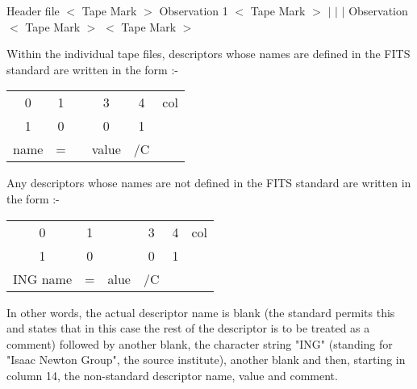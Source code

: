 {{  Header file \newline
  $<$ Tape Mark $>$ \newline
  Observation  1 \newline
  $<$ Tape Mark $>$ \newline
  $\mid$ \newline
  $\mid$ \newline
  $\mid$ \newline
  Observation   \newline
  $<$ Tape Mark $>$ \newline
  $<$ Tape Mark $>$
                                                                               
  Within the individual tape files, descriptors whose names are defined
  in the FITS standard are written in the form :-
                        
\begin{tabular}{ccp{0.5in}ccc}                                                       
  0     &   1 &       &           3       &   4  &   col \\
  1     &   0 &       &           0       &   1  &    \\
  name  &  =  &       &       value       &   /C &    \\
\end{tabular}
                                                                               
  Any descriptors whose names are not defined in the FITS standard are
  written in the form :-
                                                                               
\begin{tabular}{ccp{0.5in}ccc}                                                       
  0         &   1 &       &           3       &   4  &  col \\
  1         &   0 &       &           0       &   1  &      \\
  ING name  &  =  &  alue &               /C  &      &     \\
\end{tabular}
                                                                               
  In other words, the actual descriptor name is blank (the  standard
  permits this and states that in this case the rest of the descriptor
  is to be treated as a comment) followed by another blank, the
  character string "ING" (standing for "Isaac Newton Group", the source
  institute), another blank and then, starting in column 14, the
  non-standard descriptor name, value and comment.
                                                                               
}}

